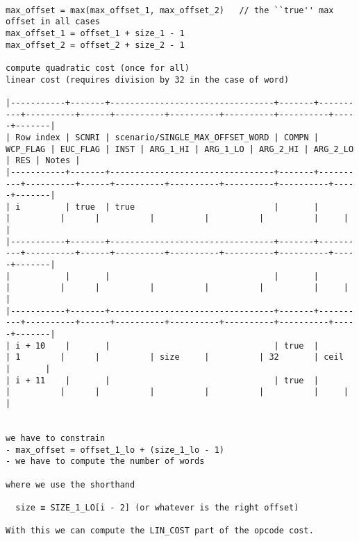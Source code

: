 \documentclass[varwidth=\maxdimen,margin=0.5cm,multi={verbatim}]{standalone}
\begin{document}
\begin{verbatim}

max_offset = max(max_offset_1, max_offset_2)   // the ``true'' max offset in all cases
max_offset_1 = offset_1 + size_1 - 1
max_offset_2 = offset_2 + size_2 - 1

compute quadratic cost (once for all)
linear cost (requires division by 32 in the case of word)

|-----------+-------+---------------------------------+-------+----------+----------+------+----------+----------+----------+----------+-----+-------|
| Row index | SCNRI | scenario/SINGLE_MAX_OFFSET_WORD | COMPN | WCP_FLAG | EUC_FLAG | INST | ARG_1_HI | ARG_1_LO | ARG_2_HI | ARG_2_LO | RES | Notes |
|-----------+-------+---------------------------------+-------+----------+----------+------+----------+----------+----------+----------+-----+-------|
| i         | true  | true                            |       |          |          |      |          |          |          |          |     |       |
|-----------+-------+---------------------------------+-------+----------+----------+------+----------+----------+----------+----------+-----+-------|
|           |       |                                 |       |          |          |      |          |          |          |          |     |       |
|-----------+-------+---------------------------------+-------+----------+----------+------+----------+----------+----------+----------+-----+-------|
| i + 10    |       |                                 | true  |          | 1        |      |          | size     |          | 32       | ceil    |       |
| i + 11    |       |                                 | true  |          |          |      |          |          |          |          |     |       |
     

we have to constrain
- max_offset = offset_1_lo + (size_1_lo - 1)
- we have to compute the number of words

where we use the shorthand

  size ≡ SIZE_1_LO[i - 2] (or whatever is the right offset)

With this we can compute the LIN_COST part of the opcode cost.

\end{verbatim}
\end{document}
